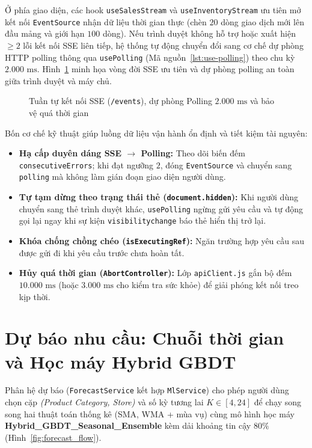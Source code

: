Ở phía giao diện, các hook \texttt{useSalesStream} và \texttt{useInventoryStream} ưu tiên mở kết nối \texttt{EventSource} nhận dữ liệu thời gian thực (chèn $20$ dòng giao dịch mới lên đầu mảng và giới hạn $100$ dòng). Nếu trình duyệt không hỗ trợ hoặc xuất hiện $\ge 2$ lỗi kết nối SSE liên tiếp, hệ thống tự động chuyển đổi sang cơ chế dự phòng HTTP polling thông qua \texttt{usePolling} (Mã nguồn~\ref{lst:use-polling}) theo chu kỳ $2.000\text{ ms}$. Hình~\ref{fig:polling_lifecycle} minh họa vòng đời SSE ưu tiên và dự phòng polling an toàn giữa trình duyệt và máy chủ.

\begin{figure}[H]
	\centering
	\caption{Tuần tự kết nối SSE (\texttt{/events}), dự phòng Polling $2.000\text{ ms}$ và bảo vệ quá thời gian}
	\label{fig:polling_lifecycle}
\end{figure}

Bốn cơ chế kỹ thuật giúp luồng dữ liệu vận hành ổn định và tiết kiệm tài nguyên:
\begin{itemize}[topsep=0pt, itemsep=1pt]
	\item \textbf{Hạ cấp duyên dáng SSE $\rightarrow$ Polling:} Theo dõi biến đếm \texttt{consecutiveErrors}; khi đạt ngưỡng $2$, đóng \texttt{EventSource} và chuyển sang \texttt{polling} mà không làm gián đoạn giao diện người dùng.
	\item \textbf{Tự tạm dừng theo trạng thái thẻ (\texttt{document.hidden}):} Khi người dùng chuyển sang thẻ trình duyệt khác, \texttt{usePolling} ngừng gửi yêu cầu và tự động gọi lại ngay khi sự kiện \texttt{visibilitychange} báo thẻ hiển thị trở lại.
	\item \textbf{Khóa chống chồng chéo (\texttt{isExecutingRef}):} Ngăn trường hợp yêu cầu sau được gửi đi khi yêu cầu trước chưa hoàn tất.
	\item \textbf{Hủy quá thời gian (\texttt{AbortController}):} Lớp \texttt{apiClient.js} gắn bộ đếm $10.000\text{ ms}$ (hoặc $3.000\text{ ms}$ cho kiểm tra sức khỏe) để giải phóng kết nối treo kịp thời.
\end{itemize}

\section{Dự báo nhu cầu: Chuỗi thời gian và Học máy Hybrid GBDT}
\label{sec:ch4-forecast}
Phân hệ dự báo (\texttt{ForecastService} kết hợp \texttt{MlService}) cho phép người dùng chọn cặp \textit{(Product Category, Store)} và số kỳ tương lai $K \in [4, 24]$ để chạy song song hai thuật toán thống kê (SMA, WMA + mùa vụ) cùng mô hình học máy \textbf{Hybrid\_GBDT\_Seasonal\_Ensemble} kèm dải khoảng tin cậy $80\%$ (Hình~\ref{fig:forecast_flow}).

